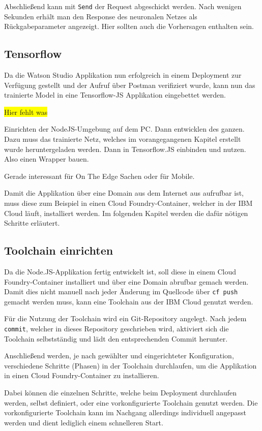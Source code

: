 Abschließend kann mit \texttt{Send} der Request abgeschickt werden. Nach wenigen Sekunden erhält man den Response des
neuronalen Netzes als Rückgabeparameter angezeigt. Hier sollten auch die Vorhersagen enthalten sein.

\subsection{Tensorflow}
Da die Watson Studio Applikation nun erfolgreich in einem Deployment zur Verfügung gestellt und der Aufruf über
Postman verifiziert wurde, kann nun das trainierte Model in eine Tensorflow-JS Applikation eingebettet werden.

\colorbox{yellow}{Hier fehlt was}

Einrichten der NodeJS-Umgebung auf dem PC. Dann entwicklen des ganzen. Dazu muss das trainierte Netz, welches im
vorangegangenen Kapitel erstellt wurde heruntergeladen werden. Dann in Tensorflow.JS einbinden und nutzen. Also einen
Wrapper bauen.

Gerade interessant für On The Edge Sachen oder für Mobile.

Damit die Applikation über eine Domain aus dem Internet aus aufrufbar ist, muss diese zum Beispiel in einen Cloud
Foundry-Container, welcher in der IBM Cloud läuft, installiert werden. Im folgenden Kapitel werden die dafür nötigen
Schritte erläutert.

\subsection{Toolchain einrichten}
Da die Node.JS-Applikation fertig entwickelt ist, soll diese in einem Cloud Foundry-Container installiert und über eine
Domain abrufbar gemach werden. Damit dies nicht manuell nach jeder Änderung im Quellcode über \texttt{cf push} gemacht
werden muss, kann eine Toolchain aus der IBM Cloud genutzt werden.

Für die Nutzung der Toolchain wird ein Git-Repository angelegt. Nach jedem \texttt{commit}, welcher in dieses Repository
geschrieben wird, aktiviert sich die Toolchain selbstständig und lädt den entsprechenden Commit herunter.

Anschließend werden, je nach gewählter und eingerichteter Konfiguration, verschiedene Schritte (Phasen) in der Toolchain
durchlaufen, um die Applikation in einen Cloud Foundry-Container zu installieren.

Dabei können die einzelnen Schritte, welche beim Deployment durchlaufen werden, selbst definiert, oder eine
vorkonfigurierte Toolchain genutzt werden. Die vorkonfigurierte Toolchain kann im Nachgang allerdings individuell
angepasst werden und dient lediglich einem schnelleren Start.


